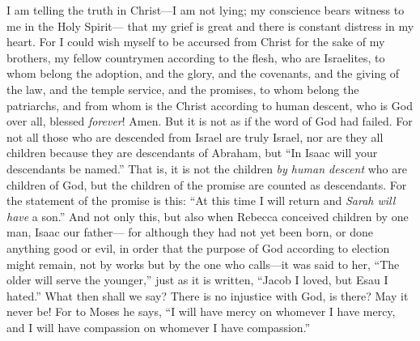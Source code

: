 \begin{biblechapter} %
 I am telling the truth in Christ—I am not lying; my conscience bears witness to me in the Holy Spirit—
\verse that my grief is great and there is constant distress in my heart.
\verse For I could wish myself to be accursed from Christ for the sake of my brothers, my fellow countrymen according to the flesh,
\verse who are Israelites, to whom belong the adoption, and the glory, and the covenants, and the giving of the law, and the temple service, and the promises,
\verse to whom belong the patriarchs, and from whom is the Christ according to human descent, who is God over all, blessed \textit{forever}! Amen.
\verse But it is not as if the word of God had failed. For not all those who are descended from Israel are truly Israel,
\verse nor are they all children because they are descendants of Abraham, but “In Isaac will your descendants be named.”
\verse That is, it is not the children \textit{by human descent} who are children of God, but the children of the promise are counted as descendants.
\verse For the statement of the promise is this: “At this time I will return and \textit{Sarah will have} a son.”
\verse And not only this, but also when Rebecca conceived children by one man, Isaac our father—
\verse for although they had not yet been born, or done anything good or evil, in order that the purpose of God according to election might remain,
\verse not by works but by the one who calls—it was said to her, “The older will serve the younger,”
\verse just as it is written, “Jacob I loved, but Esau I hated.”
 What then shall we say? There is no injustice with God, is there? May it never be!
\verse For to Moses he says, “I will have mercy on whomever I have mercy, and I will have compassion on whomever I have compassion.”

\end{biblechapter}

